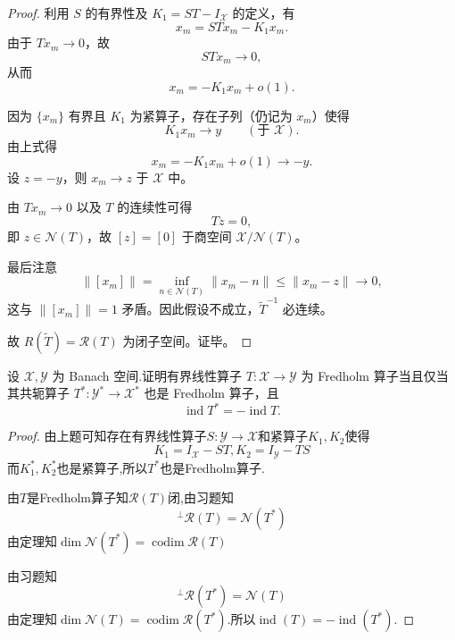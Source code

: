 \documentclass[lang=cn,newtx,10pt,scheme=chinese,thmcnt=chapter]{elegantbook}
\begin{document}
\begin{problemset}
\begin{proof}
利用 $S$ 的有界性及 $K_1 = ST - I_{\mathcal X}$ 的定义，有
\[
x_m = STx_m - K_1 x_m .
\]
由于 $T x_m\to 0$，故
\[
ST x_m \to 0,
\]
从而
\[
x_m = - K_1 x_m + o(1).
\]

因为 $\{x_m\}$ 有界且 $K_1$ 为紧算子，存在子列（仍记为 $x_m$）使得
\[
K_1 x_m \longrightarrow y \qquad (\text{于 }\mathcal X).
\]
由上式得
\[
x_m = -K_1 x_m + o(1) \longrightarrow -y.
\]
设 $z = -y$，则 $x_m\to z$ 于 $\mathcal X$ 中。

由 $T x_m \to 0$ 以及 $T$ 的连续性可得
\[
T z = 0,
\]
即 $z\in \mathcal{N}(T)$，故 $[z]=[0]$ 于商空间 $\mathcal X/\mathcal{N}(T)$。

最后注意
\[
\|[x_m]\| 
= \inf_{n\in \mathcal{N}(T)}\|x_m - n\|
\le \|x_m - z\| \longrightarrow 0,
\]
这与 $\|[x_m]\|=1$ 矛盾。因此假设不成立，$\widetilde T^{-1}$ 必连续。

故 $R(\widetilde T)=\mathcal{R}(T)$ 为闭子空间。证毕。
\end{proof}
  \item 设 \(\mathcal{X},\mathcal{Y}\) 为 Banach 空间.证明有界线性算子 \(T : \mathcal{X} \rightarrow  \mathcal{Y}\) 为 Fredholm 算子当且仅当其共轭算子 \({T}^{ * } : {\mathcal{Y}}^{ * } \rightarrow  {\mathcal{X}}^{ * }\) 也是 Fredholm 算子，且 \[
  \operatorname{ind}{T}^{ * } =  - \operatorname{ind}T.
  \]
\begin{proof}
    由上题可知存在有界线性算子$S:\mathcal{Y}\to \mathcal{X}$和紧算子$K_1,K_2$使得\[
    K_1=I_\mathcal{X}-ST,K_2=I_\mathcal{Y}-TS
    \]
    而$K_1^*,K_2^*$也是紧算子,所以$T^*$也是Fredholm算子.

    由$T$是Fredholm算子知$\mathcal{R}(T)$闭,由习题知\[ {}^\perp\mathcal{R}(T) = \mathcal{N}(T^*)\]
由定理知$\dim \mathcal{N}(T^*)=\operatorname{codim}\mathcal{R}(T)$
    
由习题知\[{}^\perp \mathcal{R}(T^*) = \mathcal{N}(T)\]
由定理知$\dim \mathcal{N}(T)=\operatorname{codim}\mathcal{R}(T^*)$.所以$\operatorname{ind}(T)=-\operatorname{ind}(T^*)$.
    

\end{proof}
\end{problemset}
\end{document}
